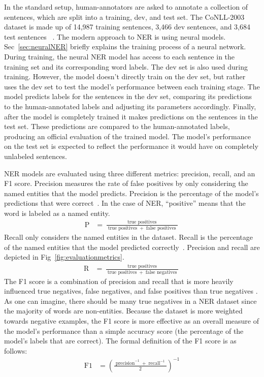 In the standard setup, human-annotators are asked to annotate a collection of sentences, which are split into a training, dev, and test set. The CoNLL-2003 dataset is made up of 14,987 training sentences, 3,466 dev sentences, and 3,684 test sentences ~\citep{conll}. The modern approach to NER is using neural models. Sec~\ref{sec:neuralNER} briefly explains the training process of a neural network. During training, the neural NER model has access to each sentence in the training set and its corresponding word labels. The dev set is also used during training. However, the model doesn't directly train on the dev set, but rather uses the dev set to test the model's performance between each training stage. The model predicts labels for the sentences in the dev set, comparing its predictions to the human-annotated labels and adjusting its parameters accordingly. Finally, after the model is completely trained it makes predictions on the sentences in the test set. These predictions are compared to the human-annotated labels, producing an official evaluation of the trained model. The model's performance on the test set is expected to reflect the performance it would have on completely unlabeled sentences.

NER models are evaluated using three different metrics: precision, recall, and an F1 score. Precision measures the rate of false positives by only considering the named entities that the model predicts. Precision is the percentage of the model's predictions that were correct~\citep{conll}. In the case of NER, ``positive'' means that the word is labeled as a named entity.
{
    {
        \begin{align*} 
            \operatorname{P} &= \frac{\operatorname{true\ positives}}{\operatorname{true\ positives} + \operatorname{false\ positives}}
        \end{align*} 
    }
}
Recall only considers the named entities in the dataset. Recall is the percentage of the named entities that the model predicted correctly~\citep{conll}. Precision and recall are depicted in Fig~\ref{fig:evaluationmetrics}.
{
    {
        \begin{align*} 
            \operatorname{R} &= \frac{\operatorname{true\ positives}}{\operatorname{true\ positives} + \operatorname{false\ negatives}}
        \end{align*} 
    }
}
 The F1 score is a combination of precision and recall that is more heavily influenced true negatives, false negatives, and false positives than true negatives \citep{NERevaluationmetrics}. As one can imagine, there should be many true negatives in a NER dataset since the majority of words are non-entities. Because the dataset is more weighted towards negative examples, the F1 score is more effective as an overall measure of the model's performance than a simple accuracy score (the percentage of the model's labels that are correct). The formal definition of the F1 score is as follows:
{
    {
        \begin{align*} 
            \operatorname{F1} &= {(\frac{\operatorname{precision}^{-1} + \operatorname{recall}^{-1}}{2})}^{-1}
        \end{align*} 
    }
}


